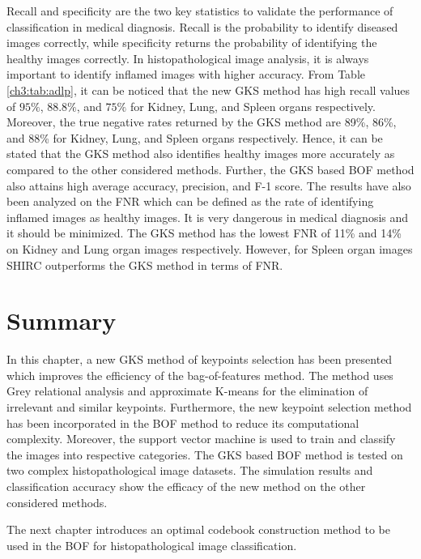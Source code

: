 Recall and specificity are the two key statistics to validate the performance of classification in medical diagnosis. Recall is the probability to identify diseased images correctly, while specificity returns the probability of identifying the healthy images correctly. In histopathological image analysis, it is always important to identify inflamed images with higher accuracy. From Table \ref{ch3:tab:adlp}, it can be noticed that the new GKS method has high recall values of $95\%$, $88.8\%$, and $75\%$ for Kidney, Lung, and Spleen organs respectively. Moreover, the true negative rates returned by the GKS method are 89\%, 86\%, and 88\% for Kidney, Lung, and Spleen organs respectively. Hence, it can be stated that the GKS method also identifies healthy images more accurately as compared to the other considered methods.  Further, the GKS based BOF method also attains high average accuracy, precision, and F-1 score. The results have also been analyzed on the FNR which can be defined as the rate of identifying inflamed images as healthy images. It is very dangerous in medical diagnosis and it should be minimized. The GKS method has the lowest FNR of 11\% and 14\% on Kidney and Lung organ images respectively. However, for Spleen organ images SHIRC outperforms the GKS method in terms of FNR. 

\section{Summary}\label{sec:con}
In this chapter, a new GKS method of keypoints selection has been presented which improves the efficiency of the bag-of-features method. The method uses Grey relational analysis and approximate K-means for the elimination of irrelevant and similar keypoints.  Furthermore, the new keypoint selection method has been incorporated in the BOF method to reduce its computational complexity. Moreover, the support vector machine is used to train and classify the images into respective categories. The GKS based BOF method is tested on two complex histopathological image datasets. The simulation results and classification accuracy show the efficacy of the new method on the other considered methods. 

The next chapter introduces an optimal codebook construction method to be used in the BOF for histopathological image classification.


